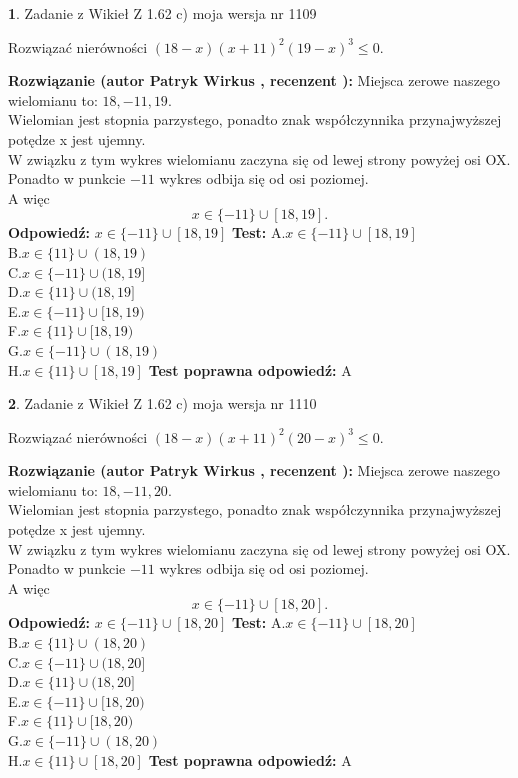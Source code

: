 \documentclass[12pt, a4paper]{article}
\theoremstyle{definition} %
\newtheorem{zad}{}
\newcommand{\zadStart}[1]{\begin{zad}#1\newline}
\newcommand{\zadStop}{\end{zad}}
\newcommand{\rozwStart}[2]{\noindent \textbf{Rozwiązanie (autor #1 , recenzent #2): }\newline}
\newcommand{\rozwStop}{\newline}
\newcommand{\odpStart}{\noindent \textbf{Odpowiedź:}\newline}
\newcommand{\odpStop}{\newline}
\newcommand{\testStart}{\noindent \textbf{Test:}\newline}
\newcommand{\testStop}{\newline}
\newcommand{\kluczStart}{\noindent \textbf{Test poprawna odpowiedź:}\newline}
\newcommand{\kluczStop}{\newline}
\begin{document}
\zadStart{Zadanie z Wikieł Z 1.62 c) moja wersja nr 1109}

Rozwiązać nierówności $(18-x)(x+11)^{2}(19-x)^{3}\le0$.
\zadStop
\rozwStart{Patryk Wirkus}{}
Miejsca zerowe naszego wielomianu to: $18, -11, 19$.\\
Wielomian jest stopnia parzystego, ponadto znak współczynnika przy\linebreak najwyższej potędze x jest ujemny.\\ W związku z tym wykres wielomianu zaczyna się od lewej strony powyżej osi OX.\\
Ponadto w punkcie $-11$ wykres odbija się od osi poziomej.\\
A więc $$x \in \{-11\} \cup [18,19].$$
\rozwStop
\odpStart
$x \in \{-11\} \cup [18,19]$
\odpStop
\testStart
A.$x \in \{-11\} \cup [18,19]$\\
B.$x \in \{11\} \cup (18,19)$\\
C.$x \in \{-11\} \cup (18,19]$\\
D.$x \in \{11\} \cup (18,19]$\\
E.$x \in \{-11\} \cup [18,19)$\\
F.$x \in \{11\} \cup [18,19)$\\
G.$x \in \{-11\} \cup (18,19)$\\
H.$x \in \{11\} \cup [18,19]$
\testStop
\kluczStart
A
\kluczStop



\zadStart{Zadanie z Wikieł Z 1.62 c) moja wersja nr 1110}

Rozwiązać nierówności $(18-x)(x+11)^{2}(20-x)^{3}\le0$.
\zadStop
\rozwStart{Patryk Wirkus}{}
Miejsca zerowe naszego wielomianu to: $18, -11, 20$.\\
Wielomian jest stopnia parzystego, ponadto znak współczynnika przy\linebreak najwyższej potędze x jest ujemny.\\ W związku z tym wykres wielomianu zaczyna się od lewej strony powyżej osi OX.\\
Ponadto w punkcie $-11$ wykres odbija się od osi poziomej.\\
A więc $$x \in \{-11\} \cup [18,20].$$
\rozwStop
\odpStart
$x \in \{-11\} \cup [18,20]$
\odpStop
\testStart
A.$x \in \{-11\} \cup [18,20]$\\
B.$x \in \{11\} \cup (18,20)$\\
C.$x \in \{-11\} \cup (18,20]$\\
D.$x \in \{11\} \cup (18,20]$\\
E.$x \in \{-11\} \cup [18,20)$\\
F.$x \in \{11\} \cup [18,20)$\\
G.$x \in \{-11\} \cup (18,20)$\\
H.$x \in \{11\} \cup [18,20]$
\testStop
\kluczStart
A
\kluczStop
\end{document}
